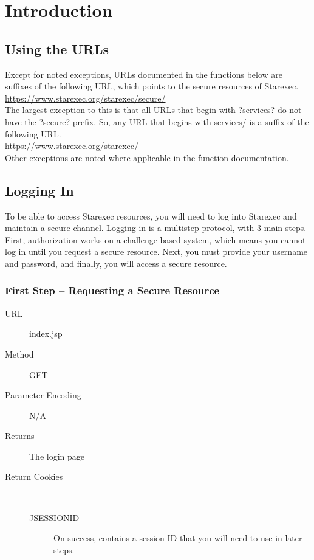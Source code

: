 \chapter{Introduction}
\section{Using the URLs}

Except for noted exceptions, URLs documented in the functions below are suffixes of the following URL, which points to the secure resources of Starexec.
\\\url{https://www.starexec.org/starexec/secure/}\\

The largest exception to this is that all URLs that begin with ?services? do not have the ?secure? prefix. So, any URL that begins with services/ is a suffix of the following URL.
\\\url{https://www.starexec.org/starexec/}\\

Other exceptions are noted where applicable in the function documentation.


\section{Logging In}

To be able to access Starexec resources, you will need to log into Starexec and maintain a secure channel. Logging in is a multistep protocol, with 3 main steps. First, authorization works on a challenge-based system, which means you cannot log in until you request a secure resource. Next, you must provide your username and password, and finally, you will access a secure resource.

\subsection{First Step -- Requesting a Secure Resource}

\begin{description}
\item [URL] index.jsp
\item [Method] GET
\item [Parameter Encoding] N/A
\item [Returns] The login page
\item [Return Cookies] \

	\begin{description}
	\item [JSESSIONID]  On success, contains a session ID that you will need to use in later steps.
	\end{description}
\end{description}

